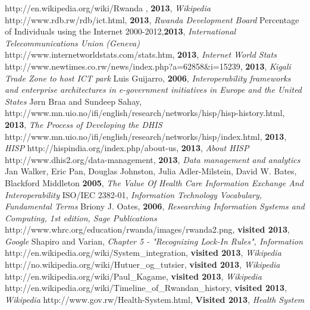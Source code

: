 \begin{thebibliography}{99}
http://en.wikipedia.org/wiki/Rwanda , {\bfseries 2013}, {\itshape Wikipedia}
http://www.rdb.rw/rdb/ict.html, {\bfseries 2013}, {\itshape Rwanda Development Board}
Percentage of Individuals using the Internet 2000-2012,{\bfseries 2013}, {\itshape International Telecommunications Union (Geneva)}
http://www.internetworldstats.com/stats.htm, {\bfseries 2013}, {\itshape Internet World Stats}
http://www.newtimes.co.rw/news/index.php?a=62858\&i=15239, {\bfseries 2013}, {\itshape Kigali Trade Zone to host ICT park}
Luis Guijarro, {\bfseries 2006}, {\itshape Interoperability frameworks and enterprise architectures in e-government initiatives in Europe and the United States}
Jørn Braa and Sundeep Sahay, http://www.mn.uio.no/ifi/english/research/networks/hisp/hisp-history.html, {\bfseries 2013}, {\itshape The Process of Developing the DHIS}
http://www.mn.uio.no/ifi/english/research/networks/hisp/index.html, {\bfseries 2013}, {\itshape HISP}
http://hispindia.org/index.php/about-us, {\bfseries 2013}, {\itshape About HISP}
http://www.dhis2.org/data-management, {\bfseries 2013}, {\itshape Data management and analytics}
Jan Walker, Eric Pan, Douglas Johnston, Julia Adler-Milstein, David W. Bates, Blackford Middleton {\bfseries 2005}, {\itshape The Value Of Health Care Information Exchange And Interoperability}
ISO/IEC 2382-01, {\itshape Information Technology Vocabulary, Fundamental Terms}
Briony J. Oates, {\bfseries 2006}, {\itshape Researching Information Systems and Computing, 1st edition, Sage Publications}
http://www.whrc.org/education/rwanda/images/rwanda2.png, {\bfseries visited 2013}, {\itshape Google}
Shapiro and Varian, {\itshape Chapter 5 - "Recognizing Lock-In Rules", Information}	
http://en.wikipedia.org/wiki/System\_integration, {\bfseries visited 2013}, {\itshape Wikipedia}
http://no.wikipedia.org/wiki/Hutuer\_og\_tutsier, {\bfseries visited 2013}, {\itshape Wikipedia}
http://en.wikipedia.org/wiki/Paul\_Kagame, {\bfseries visited 2013}, {\itshape Wikipedia}
http://en.wikipedia.org/wiki/Timeline\_of\_Rwandan\_history, {\bfseries visited 2013}, {\itshape Wikipedia}
http://www.gov.rw/Health-System.html, {\bfseries Visited 2013}, {\itshape Health System}
\end{thebibliography}